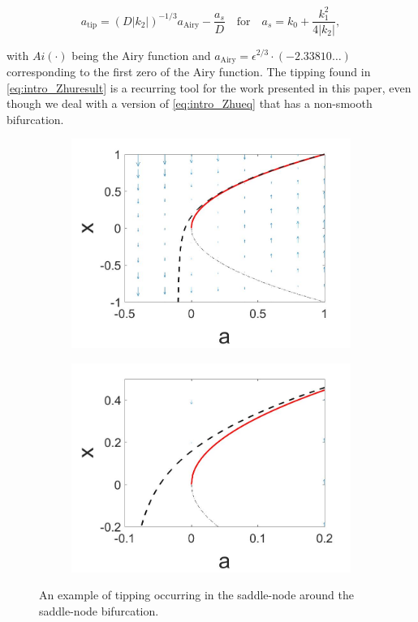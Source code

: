 \begin{equation}\label{eq:intro_Zhuresult}
a_{\text{tip}}=(D|k_2|)^{-1/3}a_{\text{Airy}}-\frac{a_s}{D}\quad \text{for} \quad a_s = k_0+\frac{k_1^2}{4|k_2|},
\end{equation}

with $Ai(\cdot)$ being the Airy function and $a_{\text{Airy}}=\epsilon^{2/3}\cdot(-2.33810\ldots)$ corresponding to the first zero of the Airy function. The tipping found in \eqref{eq:intro_Zhuresult} is a recurring tool for the work presented in this paper, even though we deal with a version of \eqref{eq:intro_Zhueq} that has a non-smooth bifurcation.

\begin{figure}[H]
\centering
\begin{subfigure}{.5\textwidth}
 \centering
 \includegraphics[width=\linewidth]{intro/saddlenode_tipping.jpg}
 \caption{}
\end{subfigure}%
\begin{subfigure}{.5\textwidth}
 \centering
 \includegraphics[width=\linewidth]{intro/saddlenode_tipping_zoom.jpg}
 \caption{}
\end{subfigure}
\caption{An example of tipping occurring in the saddle-node around the saddle-node bifurcation.}
\label{fig:intro_tipping}
\end{figure}


